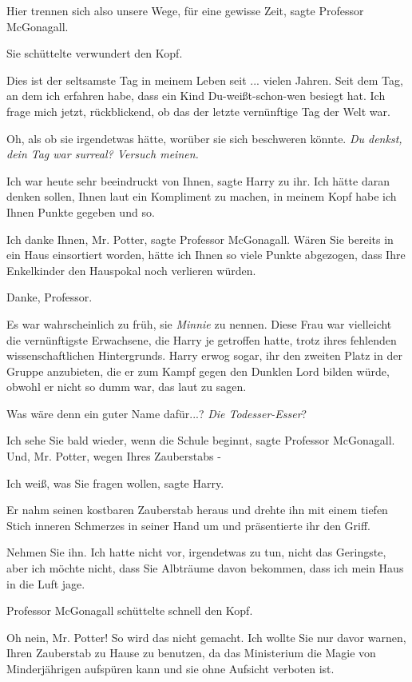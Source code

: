 \glqq{}Hier trennen sich also unsere Wege, für eine gewisse Zeit\grqq{}, sagte
Professor McGonagall.

Sie schüttelte verwundert den Kopf.

\glqq{}Dies ist der seltsamste Tag in meinem Leben seit ... vielen Jahren. Seit
dem Tag, an dem ich erfahren habe, dass ein Kind Du-weißt-schon-wen besiegt hat.
Ich frage mich jetzt, rückblickend, ob das der letzte vernünftige Tag der Welt
war.\grqq{}

Oh, als ob sie irgendetwas hätte, worüber sie sich beschweren könnte. \emph{Du
denkst, dein Tag war surreal? Versuch meinen.}

\glqq{}Ich war heute sehr beeindruckt von Ihnen\grqq{}, sagte Harry zu ihr. \glqq
Ich hätte daran denken sollen, Ihnen laut ein Kompliment zu machen, in meinem
Kopf habe ich Ihnen Punkte gegeben und so.\grqq{}

\glqq{}Ich danke Ihnen, Mr. Potter\grqq{}, sagte Professor McGonagall. \glqq
Wären Sie bereits in ein Haus einsortiert worden, hätte ich Ihnen so viele
Punkte abgezogen, dass Ihre Enkelkinder den Hauspokal noch verlieren
würden.\grqq{}

\glqq{}Danke, Professor.\grqq{}

Es war wahrscheinlich zu früh, sie \emph{Minnie} zu nennen. Diese Frau war
vielleicht die vernünftigste Erwachsene, die Harry je getroffen hatte, trotz
ihres fehlenden wissenschaftlichen Hintergrunds. Harry erwog sogar, ihr den
zweiten Platz in der Gruppe anzubieten, die er zum Kampf gegen den Dunklen Lord
bilden würde, obwohl er nicht so dumm war, das laut zu sagen.

Was wäre denn ein guter Name dafür...? \emph{Die Todesser-Esser}?

\glqq{}Ich sehe Sie bald wieder, wenn die Schule beginnt\grqq{}, sagte Professor
McGonagall. \glqq{}Und, Mr. Potter, wegen Ihres Zauberstabs -\grqq{}

\glqq{}Ich weiß, was Sie fragen wollen\grqq{}, sagte Harry.

Er nahm seinen kostbaren Zauberstab heraus und drehte ihn mit einem tiefen Stich
inneren Schmerzes in seiner Hand um und präsentierte ihr den Griff.

\glqq{}Nehmen Sie ihn. Ich hatte nicht vor, irgendetwas zu tun, nicht das
Geringste, aber ich möchte nicht, dass Sie Albträume davon bekommen, dass ich
mein Haus in die Luft jage.\grqq{}

Professor McGonagall schüttelte schnell den Kopf.

\glqq{}Oh nein, Mr. Potter! So wird das nicht gemacht. Ich wollte Sie nur davor
warnen, Ihren Zauberstab zu Hause zu benutzen, da das Ministerium die Magie von
Minderjährigen aufspüren kann und sie ohne Aufsicht verboten ist.\grqq{}


